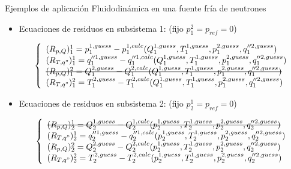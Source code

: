 \begin{frame}
{Ejemplos de aplicación}
{Fluidodinámica en una fuente fría de neutrones}

\begin{itemize}
\item Ecuaciones de residuos en subsistema 1: (fijo $p_1^2=p_{ref}=0$)

\begin{equation*}
\left\{ \begin{array}{l}
(R_{p,Q})_{1}^{1}  = p_1^{1, guess} - p_1^{1, calc}(Q_1^{1, guess}, T_1^{1, guess}, p_1^{2, guess}, q_1''^{2, guess}) \\
(R_{T,q"})_{1}^{1} = q_{1}''^{1, guess} - q_{1}''^{1, calc}(Q_1^{1, guess}, T_1^{1, guess}, p_1^{2, guess}, q_1''^{2, guess}) \\
$\sout{$(R_{p,Q})_{1}^{2} = Q_1^{2, guess} - Q_1^{2, calc}(Q_1^{1, guess}, T_1^{1, guess}, p_1^{2, guess}, q_1''^{2, guess})$}$ \\
(R_{T,q"})_{1}^{2} = T_1^{2, guess} - T_1^{2, calc}(Q_1^{1, guess}, T_1^{1, guess}, p_1^{2, guess}, q_1''^{2, guess})
\end{array}
\right.
\label{residuos-1}
\end{equation*}

\item Ecuaciones de residuos en subsistema 2: (fijo $p_2^1=p_{ref}=0$)

\begin{equation*}
\left\{ \begin{array}{l}
$\sout{$(R_{p,Q})_{2}^{1}  = Q_2^{1, guess} - Q_2^{1, calc}(p_2^{1, guess}, T_2^{1, guess}, p_2^{2, guess}, q_2''^{2, guess})$}$  \\
(R_{T,q"})_{2}^{1} = q_{2}''^{1, guess} - q_{2}''^{1, calc}(p_2^{1, guess}, T_2^{1, guess}, p_2^{2, guess}, q_2''^{2, guess}) \\
(R_{p,Q})_{2}^{2}  = Q_2^{2, guess} - Q_2^{2, calc}(p_2^{1, guess}, T_2^{1, guess}, p_2^{2, guess}, q_2''^{2, guess})  \\
(R_{T,q"})_{2}^{2} = T_2^{2, guess} - T_2^{2, calc}(p_2^{1, guess}, T_2^{1, guess}, p_2^{2, guess}, q_2''^{2, guess}) 
\end{array}
\right.
\label{residuos-2}
\end{equation*}

\end{itemize}

\end{frame}




